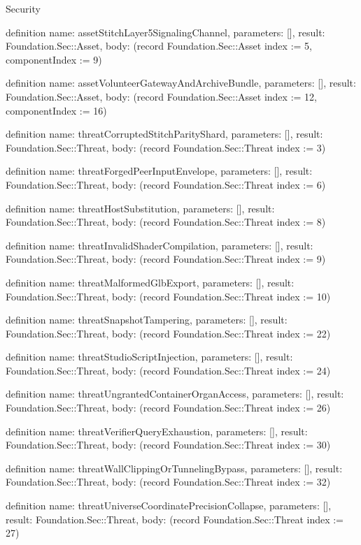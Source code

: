 \begin{lexlean}{Security}
\begin{semanticmodule}
definition{
  name: assetStitchLayer5SignalingChannel,
  parameters: [],
  result: Foundation.Sec::Asset,
  body: (record Foundation.Sec::Asset {index := 5, componentIndex := 9})
}

definition{
  name: assetVolunteerGatewayAndArchiveBundle,
  parameters: [],
  result: Foundation.Sec::Asset,
  body: (record Foundation.Sec::Asset {index := 12, componentIndex := 16})
}

definition{
  name: threatCorruptedStitchParityShard,
  parameters: [],
  result: Foundation.Sec::Threat,
  body: (record Foundation.Sec::Threat {index := 3})
}

definition{
  name: threatForgedPeerInputEnvelope,
  parameters: [],
  result: Foundation.Sec::Threat,
  body: (record Foundation.Sec::Threat {index := 6})
}

definition{
  name: threatHostSubstitution,
  parameters: [],
  result: Foundation.Sec::Threat,
  body: (record Foundation.Sec::Threat {index := 8})
}

definition{
  name: threatInvalidShaderCompilation,
  parameters: [],
  result: Foundation.Sec::Threat,
  body: (record Foundation.Sec::Threat {index := 9})
}

definition{
  name: threatMalformedGlbExport,
  parameters: [],
  result: Foundation.Sec::Threat,
  body: (record Foundation.Sec::Threat {index := 10})
}

definition{
  name: threatSnapshotTampering,
  parameters: [],
  result: Foundation.Sec::Threat,
  body: (record Foundation.Sec::Threat {index := 22})
}

definition{
  name: threatStudioScriptInjection,
  parameters: [],
  result: Foundation.Sec::Threat,
  body: (record Foundation.Sec::Threat {index := 24})
}

definition{
  name: threatUngrantedContainerOrganAccess,
  parameters: [],
  result: Foundation.Sec::Threat,
  body: (record Foundation.Sec::Threat {index := 26})
}

definition{
  name: threatVerifierQueryExhaustion,
  parameters: [],
  result: Foundation.Sec::Threat,
  body: (record Foundation.Sec::Threat {index := 30})
}

definition{
  name: threatWallClippingOrTunnelingBypass,
  parameters: [],
  result: Foundation.Sec::Threat,
  body: (record Foundation.Sec::Threat {index := 32})
}

definition{
  name: threatUniverseCoordinatePrecisionCollapse,
  parameters: [],
  result: Foundation.Sec::Threat,
  body: (record Foundation.Sec::Threat {index := 27})
}


\end{semanticmodule}
\end{lexlean}
